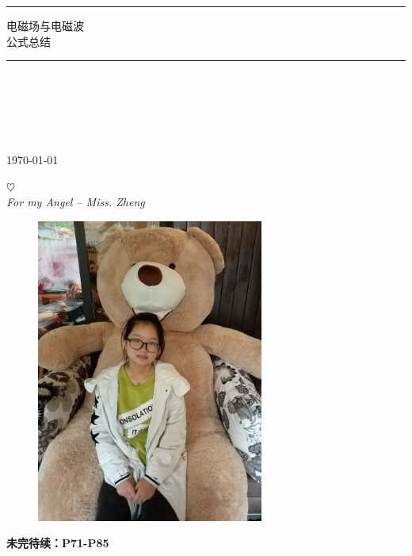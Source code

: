 \documentclass[a4paper,12pt]{ctexbook}
\begin{document}
\begin{titlepage}
\begin{center}
\hspace{6cm}
\rule{\linewidth}{0.7mm}
{\heiti{} 电磁场与电磁波\\[0.5cm]公式总结}\\[0.5cm]
\rule{\linewidth}{0.7mm}\\[2cm]

\begin{minipage}{0.4\textwidth}
	\begin{flushleft} \large
		\\
	\end{flushleft}
\end{minipage}
\begin{minipage}{0.4\textwidth}
	\begin{flushright} \large
		 \\
	\end{flushright}
\end{minipage}
\vfill
\Large \today
\end{center}
\end{titlepage}

\frontmatter

\begin{center}
	$\heartsuit$\\[2.5cm]
	
	\LARGE \textit{For my Angel -- Miss. Zheng}\\[1cm]
	
	\begin{figure}[h]
		\centering
		\includegraphics[keepaspectratio, height=10cm, angle=270]{pics/angel}
		\label{fig:angel}
	\end{figure}
	
\end{center}

\tableofcontents

\mainmatter






\newpage
\begin{center}
	\textbf{未完待续：P71-P85}
\end{center}

\backmatter
\end{document}
